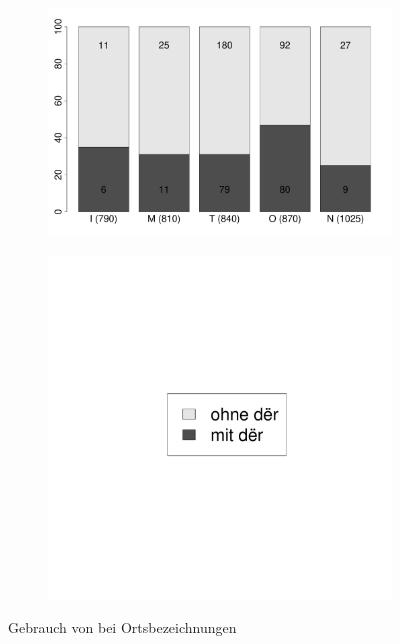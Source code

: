 \begin{figure}
\begin{subfigure}[b]{.6\linewidth}
  \includegraphics[width=10 cm]{generated/images/ort}
\end{subfigure}%
\begin{subfigure}[b]{.1\linewidth}
  \includegraphics[width=6 cm]{generated/images/ort-legende}
\end{subfigure}

\caption{Gebrauch von  bei Ortsbezeichnungen}
  \label{fig:bel:orte}
\end{figure} 



